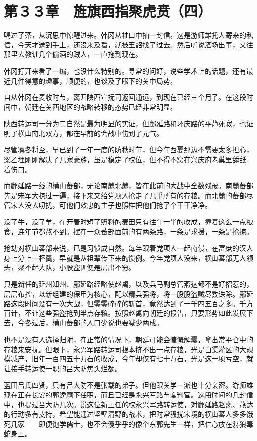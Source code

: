\section{第３３章　旌旗西指聚虎贲（四）}

喝过了茶，从沉思中惊醒过来。韩冈从袖口中抽一封信。这是游师雄托人寄来的私信，今天才送到手上，还没来及看，就被王韶找了过去。然后听说酒场出事，又往那里去教训几个偷酒的贼人，一直拖到现在。

韩冈打开来看了一编，也没什么特别的。寻常的问好，说些学术上的话题，还有最近几件得意的趣事，顺便的，也谈及了眼下的关中局势。

自从韩冈在麦收时节，离开陕西宣抚司返回通远，到现在已经三个月了。在这段时间中，朝廷在关西地区的战略转移的态势已经非常明显。

陕西转运司一分为二自然是最为明显的实证，但鄜延路和环庆路的平静死寂，也证明了横山南北双方，都在早前的会战中伤到了元气。

尽管凛冬将至，早已到了一年一度的防秋时节，但今年西夏那边不需要太多担心，梁乙埋刚刚解决了几家豪族，虽是稳定了权位，但不得不窝在兴庆府老巢里舔舐.着伤口。

而鄜延路一线的横山蕃部，无论南麓北麓，皆在此前的大战中全数残破。南麓蕃部先是宋军大掠过一遍，接下来又给党项人抢走了几乎所有的存粮。而北麓的蕃部尽管宋人没去叨扰，可他们效忠的主子也照样把他们抢了个干干净净。

没了牛，没了羊，在开春时短了照料的麦田只有往年一半的收成，靠着这么一点粮食，连年节都熬不到。摆在一众蕃部面前的有两条路，一条是求援，一条是抢掠。

抢劫对横山蕃部来说，已是习惯成自然。每年跟着党项人一起南侵，在富庶的汉人身上分上一杯羹，早就是从祖辈传下来的惯例。今年党项人没来，横山蕃部无人领头，聚不起大队，小股盗匪便是层出不穷。

只是新任的延州知州、鄜延路经略使赵禼，以及兵马副总管燕达都不是好招惹的，层层布控，以新组建的保甲为核心，配以精兵强将，将一股股盗贼尽数诛除。鄜延路这段时间没有一次大战，但零零碎碎的斩首，竟然达到了一千四五百之多。千方百计，不让这些强盗抢到半点存粮。按照赵禼向朝廷的报告，只要形势如此发展下去，今冬过后，横山蕃部的人口少说也要减少两成。

也不是没有人选择归附，在正常的情况下，朝廷可能会慷慨解囊，拿出常平仓中的存粮来安抚。但眼下，永兴军路转运司根本挤不出一点存粮，光是白渠灌区的大规模减产，旧年一百四五十万石的收成，今年却仅有七十万石，光是这一项亏空，就让接手转运使一职的吕大防焦头烂额。

蓝田吕氏四贤，只有吕大防不是张载的弟子。但他跟关学一派也十分亲密。游师雄现在正在长安的郭逵麾下任职，而且已经是永兴军路节度判官。这段时间的几封信中，也提过吕大防几次。说这位新上任的权永兴军路转运使，对鄜延路赵禼、燕达的行动多有支持，希望能通过坚壁清野的战术，把时常骚扰宋境的横山蕃人多多饿死几家——即便饱学儒士，也不会傻乎乎的像个东郭先生一样，把仁心放在豺狼毒蛇身上。

